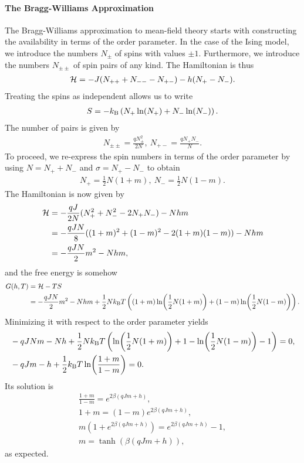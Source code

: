 \paragraph{The Bragg-Williams Approximation}
The Bragg-Williams approximation to mean-field theory starts with constructing the availability in terms of the order parameter. In the case of the Ising model, we introduce the numbers $N_{\pm}$ of spins with values $\pm 1$. Furthermore, we introduce the numbers $N_{\pm\pm}$ of spin pairs of any kind. The Hamiltonian is thus
\begin{align*}
	\mathcal{H} = -J(N_{++} + N_{--} - N_{+-}) - h(N_{+} - N_{-}).
\end{align*}
Treating the spins as independent allows us to write
\begin{align*}
	S = -k_{\text{B}}\left(N_{+}\ln(N_{+}) + N_{-}\ln(N_{-})\right).
\end{align*}
The number of pairs is given by
\begin{align*}
	N_{\pm\pm} = \frac{qN_{\pm}^{2}}{2N},\ N_{+-} = \frac{qN_{+}N_{-}}{N}.
\end{align*}
To proceed, we re-express the spin numbers in terms of the order parameter by using $N = N_{+} + N_{-}$ and $\sigma = N_{+} - N_{-}$ to obtain
\begin{align*}
	N_{+} = \frac{1}{2}N(1 + m),\ N_{-} = \frac{1}{2}N(1 - m).
\end{align*}
The Hamiltonian is now given by
\begin{align*}
	\mathcal{H} &= -\frac{qJ}{2N}(N_{+}^{2} + N_{-}^{2} - 2N_{+}N_{-}) - Nhm \\
	     &= -\frac{qJN}{8}((1 + m)^{2} + (1 - m)^{2} - 2(1 + m)(1 - m)) - Nhm \\
	     &= -\frac{qJN}{2}m^{2} - Nhm,
\end{align*}
and the free energy is somehow
\begin{align*}
	G(h, T) &= \mathcal{H} - TS \\
	        &= -\frac{qJN}{2}m^{2} - Nhm + \frac{1}{2}Nk_{\text{B}} T\left((1 + m)\ln(\frac{1}{2}N(1 + m)) + (1 - m)\ln(\frac{1}{2}N(1 - m))\right).
\end{align*}
Minimizing it with respect to the order parameter yields
\begin{align*}
	&-qJNm - Nh + \frac{1}{2}Nk_{\text{B}} T\left(\ln(\frac{1}{2}N(1 + m)) + 1 - \ln(\frac{1}{2}N(1 - m)) - 1\right) = 0, \\
	&-qJm - h + \frac{1}{2}k_{\text{B}} T\ln(\frac{1 + m}{1 - m}) = 0.
\end{align*}
Its solution is
\begin{align*}
	\frac{1 + m}{1 - m} = e^{2\beta(qJm + h)}, \\
	1 + m = (1 - m)e^{2\beta(qJm + h)}, \\
	m(1 + e^{2\beta(qJm + h)}) = e^{2\beta(qJm + h)} - 1, \\
	m = \tanh(\beta(qJm + h)),
\end{align*}
as expected.


